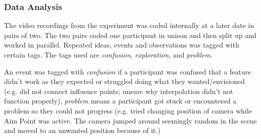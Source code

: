 \subsubsection{Data Analysis}
The video recordings from the experiment was coded internally at a later date in pairs of two. The two pairs coded one participant in unison and then split up and worked in parallel. Repeated ideas, events and observations was tagged with certain tags. The tags used are \textit{confusion}, \textit{exploration}, and \textit{problem}.

An event was tagged with \textit{confusion} if a participant was confused that a feature didn't work as they expected or struggled doing what they wanted/envisioned (e.g. did not connect influence points; unsure why interpolation didn't not function properly), 
\textit{problem} means a participant got stuck or encountered a problem so they could not progress (e.g. tried changing position of camera while Aim Point was active. The camera jumped around seemingly random in the scene and moved to an unwanted position because of it.)
